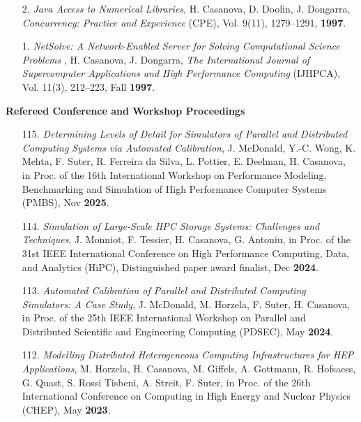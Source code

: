 \begin{enumerate}
\item[2.]
{\it Java Access to Numerical Libraries}, H. Casanova, D. Doolin,
J. Dongarra, \emph{Concurrency: Practice and Experience} (CPE), Vol. 9(11),
1279--1291, {\bf 1997}.

\item[1.]
{\it NetSolve: A Network-Enabled Server for Solving Computational
Science Problems }, H. Casanova, J. Dongarra, {\em The International
Journal of Supercomputer Applications and High Performance Computing}
(IJHPCA), Vol. 11(3), 212--223, Fall {\bf 1997}. 

\end{enumerate}

\noindent
{\bf Refereed Conference and Workshop Proceedings}

\begin{enumerate}

	\item [115.] {\it Determining Levels of Detail for Simulators of Parallel and Distributed Computing Systems via Automated Calibration}, J. McDonald, Y.-C. Wong, K. Mehta, F. Suter, R. Ferreira da Silva, L. Pottier, E. Deelman, H. Casanova, in Proc. of the 16th International Workshop on Performance Modeling, Benchmarking and Simulation of High Performance Computer Systems (PMBS), Nov {\bf 2025}.

    \item [114.] {\it Simulation of Large-Scale HPC Storage Systems: Challenges and Techniques}, J. Monniot, F. Tessier, H. Casanova, G. Antoniu, in Proc. of the 31st IEEE International Conference on High Performance Computing, Data, and Analytics (HiPC), Distinguished paper award finalist, Dec {\bf 2024}.

    \item [113.] {\it Automated Calibration of Parallel and  Distributed Computing Simulators: A Case Study}, J. McDonald, M. Horzela, F. Suter, H. Casanova, in  Proc. of the 25th IEEE International Workshop on Parallel and Distributed Scientific and Engineering Computing (PDSEC), May {\bf 2024}.

    \item [112.] {\it Modelling Distributed Heterogeneous Computing Infrastructures for HEP Applications}, M. Horzela, H. Casanova, M. Giffels, A. Gottmann, R. Hofsaess, G. Quast, S. Rossi Tisbeni, A. Streit, F. Suter, in  Proc. of the 26th International Conference on Computing in High Energy and Nuclear Physics (CHEP), May {\bf 2023}.


\end{enumerate}
